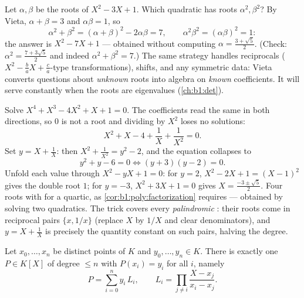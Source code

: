 \begin{example}\label{ex:b1:poly:transformroots}
Let $\alpha, \beta$ be the roots of $X^2 - 3X + 1$. Which 
quadratic has roots $\alpha^2, \beta^2$? By Vieta, $\alpha +
\beta = 3$ and $\alpha\beta = 1$, so
\[
\alpha^2 + \beta^2 = (\alpha+\beta)^2 - 2\alpha\beta = 7,
\qquad
\alpha^2\beta^2 = (\alpha\beta)^2 = 1 :
\]
the answer is $X^2 - 7X + 1$ --- obtained without computing
$\alpha = \frac{3 + \sqrt5}2$. (Check: $\alpha^2 = \frac{7 +
3\sqrt5}2$ and indeed $\alpha^2 + \beta^2 = 7$.) The same
strategy handles reciprocals ($X^2 - \frac ba X + \frac
ca$-type transformations), shifts, and any symmetric data: Vieta
converts questions about \emph{unknown} roots into algebra on
\emph{known} coefficients. It will serve constantly when the
roots are eigenvalues (\cref{ch:b1:det}).
\end{example}

\begin{example}\label{ex:b1:poly:palindrome}
Solve $X^4 + X^3 - 4X^2 + X + 1 = 0$. The coefficients read the
same in both directions, so $0$ is not a root and dividing by
$X^2$ loses no solutions:
\[
X^2 + X - 4 + \frac1X + \frac1{X^2} = 0 .
\]
Set $y = X + \frac1X$: then $X^2 + \frac1{X^2} = y^2 - 2$, and
the equation collapses to
\[
y^2 + y - 6 = 0 \iff (y + 3)(y - 2) = 0 .
\]
Unfold each value through $X^2 - yX + 1 = 0$: for $y = 2$, $X^2 -
2X + 1 = (X - 1)^2$ gives the double root $1$; for $y = -3$,
$X^2 + 3X + 1 = 0$ gives $X = \frac{-3 \pm \sqrt5}2$. Four roots
with  for a quartic, as
\cref{cor:b1:poly:factorization} requires --- obtained by solving
two quadratics. The trick covers every \emph{palindromic}
: their roots come in reciprocal pairs $\{x, 1/x\}$
(replace $X$ by $1/X$ and clear denominators), and $y = X +
\frac1X$ is precisely the quantity constant on such pairs,
halving the degree.
\end{example}

\begin{theorem}\label{thm:b1:poly:lagrange}
Let $x_0, \dots, x_n$ be distinct points of $K$ and $y_0, \dots, y_n
\in K$. There is exactly one $P \in K[X]$ of degree $\leq n$ with
$P(x_i) = y_i$ for all $i$, namely
\[
P = \sum_{i=0}^{n} y_i\, L_i,
\qquad
L_i = \prod_{j \neq i} \frac{X - x_j}{x_i - x_j} .
\]
\end{theorem}

